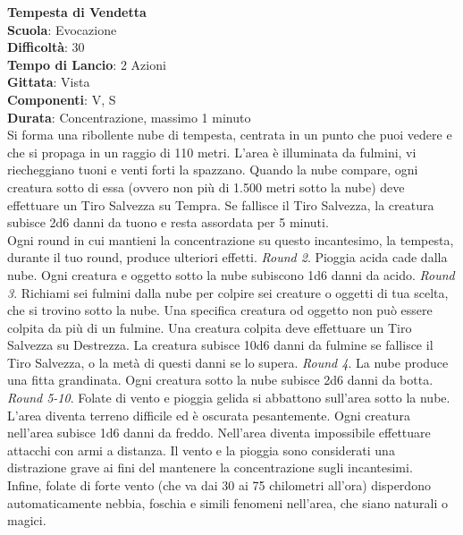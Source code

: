 \begin{multicols}{2}
\medskip\textbf{Tempesta di Vendetta}\\
\textbf{Scuola}: Evocazione\\
\textbf{Difficoltà}:  30\\
\textbf{Tempo di Lancio}: 2 Azioni\\
\textbf{Gittata}: Vista\\
\textbf{Componenti}: V, S\\
\textbf{Durata}: Concentrazione, massimo 1 minuto\\
Si forma una ribollente nube di tempesta, centrata in un punto che puoi vedere e che si propaga in un raggio di 110 metri. L’area è illuminata da fulmini, vi riecheggiano tuoni e venti forti la spazzano. Quando la nube compare, ogni creatura sotto di essa (ovvero non più di 1.500 metri sotto la nube) deve effettuare un Tiro Salvezza su Tempra. Se fallisce il Tiro Salvezza, la creatura subisce 2d6 danni da tuono e resta assordata per 5 minuti.\\
Ogni round in cui mantieni la concentrazione su questo incantesimo, la tempesta, durante il tuo round, produce ulteriori effetti.
\textit{Round 2}. Pioggia acida cade dalla nube. Ogni creatura e oggetto sotto la nube subiscono 1d6 danni da acido.
\textit{Round 3}. Richiami sei fulmini dalla nube per colpire sei creature o oggetti di tua scelta, che si trovino sotto la nube. Una specifica creatura od oggetto non può essere colpita da più di un fulmine. Una creatura colpita deve effettuare un Tiro Salvezza su Destrezza. La creatura subisce 10d6 danni da fulmine se fallisce il Tiro Salvezza, o la metà di questi danni se lo supera. 
\textit{Round 4}. La nube produce una fitta grandinata. Ogni creatura sotto la nube subisce 2d6 danni da botta.
\textit{Round 5-10}. Folate di vento e pioggia gelida si abbattono sull'area sotto la nube. L’area diventa terreno difficile ed è oscurata pesantemente. Ogni creatura nell'area subisce 1d6 danni da freddo. Nell'area diventa impossibile effettuare attacchi con armi a distanza. Il vento e la pioggia sono considerati una distrazione grave ai fini del mantenere la concentrazione sugli incantesimi.\\ Infine, folate di forte vento (che va dai 30 ai 75 chilometri all'ora) disperdono automaticamente nebbia, foschia e simili fenomeni nell'area, che siano naturali o magici.


\end{multicols}
